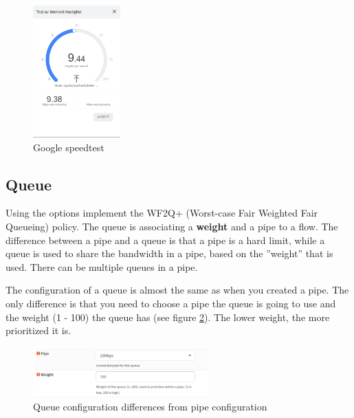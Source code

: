 
\begin{figure}[h!]
    \centering
    \includegraphics[width=0.3\textwidth]{Images/bandwidth/up_down.PNG}
    \caption{Google speedtest}
    \label{opnsense:bandwidth_speed}
\end{figure}

\subsection{Queue}
Using the  options implement the WF2Q+ (Worst-case Fair Weighted Fair Queueing) policy. The queue is associating a \textbf{weight} and a pipe to a flow. The difference between a pipe and a queue is that a pipe is a hard limit, while a queue is used to share the bandwidth in a pipe, based on the ''weight'' that is used. There can be multiple queues in a pipe.

The configuration of a queue is almost the same as when you created a pipe. The only difference is that you need to choose a pipe the queue is going to use and the weight (1 - 100) the queue has (see figure \ref{opnsense:bandwidth_queue}). The lower weight, the more prioritized it is.

\begin{figure}[h!]
    \centering
    \includegraphics[width=0.6\textwidth]{Images/bandwidth/queue.PNG}
    \caption{Queue configuration differences from pipe configuration}
    \label{opnsense:bandwidth_queue}
\end{figure}

